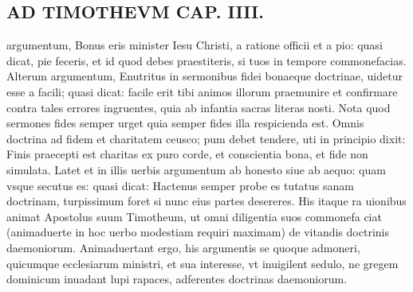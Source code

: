 \documentclass{article}
\begin{document}
\begin{pages}
\section*{AD TIMOTHEVM CAP. IIII. }
\marginpar{[ p.96 ]}\pstart argumentum, Bonus eris minister Iesu Christi, a ratione officii et a pio: quasi dicat, pie feceris, et id quod debes praestiteris, si tuos in tempore commonefacias. Alterum argumentum, Enutritus in sermonibus fidei bonaeque doctrinae, uidetur esse a facili; quasi dicat: facile erit tibi animos illorum praemunire et confirmare contra tales errores ingruentes, quia ab infantia sacras literas nosti. Nota quod sermones fides semper urget quia semper fides illa respicienda est. Omnis doctrina ad fidem et charitatem ceusco; pum debet tendere, uti in principio dixit: Finis praecepti est charitas ex puro corde, et conscientia bona, et fide non simulata. Latet et in illis uerbis argumentum ab honesto siue ab aequo: quam vsque secutus es: quasi dicat: Hactenus semper probe es tutatus sanam doctrinam, turpissimum foret si nunc eius partes desereres. His itaque ra uionibus animat Apostolus suum Timotheum, ut omni diligentia suos commonefa ciat (animaduerte in hoc uerbo modestiam requiri maximam) de vitandis doctrinis daemoniorum. Animaduertant ergo, his argumentis se quoque admoneri, quicumque ecclesiarum ministri, et sua interesse, vt inuigilent sedulo, ne gregem dominicum inuadant lupi rapaces, adferentes doctrinas daemoniorum.  \pend
{}
{}

\end{pages}
\end{document}
